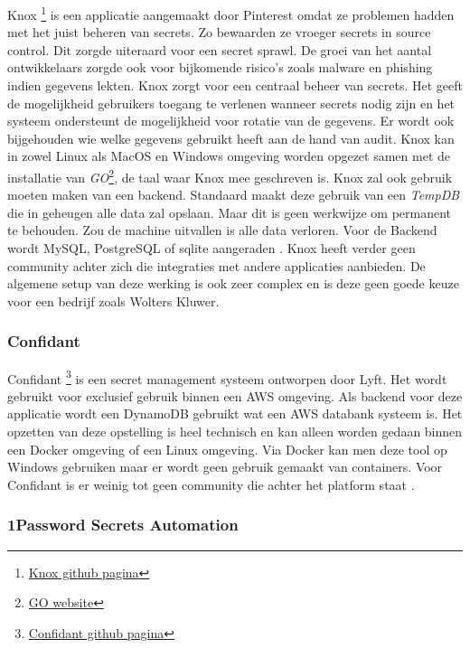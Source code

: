 Knox \footnote{\href{https://github.com/pinterest/knox}{Knox github pagina}} is een applicatie aangemaakt door Pinterest omdat ze problemen hadden met het juist beheren van secrets. Zo bewaarden ze vroeger secrets in source control. Dit zorgde uiteraard voor een secret sprawl. De groei van het aantal ontwikkelaars zorgde ook voor bijkomende risico's zoals malware en phishing indien gegevens lekten. Knox zorgt voor een centraal beheer van secrets. Het geeft de mogelijkheid gebruikers toegang te verlenen wanneer secrets nodig zijn en het systeem ondersteunt de mogelijkheid voor rotatie van de gegevens. Er wordt ook bijgehouden wie welke gegevens gebruikt heeft aan de hand van audit. Knox kan in zowel Linux als MacOS en Windows omgeving worden opgezet samen met de installatie van \textit{GO}\footnote{\href{https://golang.org/doc/install}{GO website}}, de taal waar Knox mee geschreven is. Knox zal ook gebruik moeten maken van een backend. Standaard maakt deze gebruik van een \textit{TempDB} die in geheugen alle data zal opslaan. Maar dit is geen werkwijze om permanent te behouden. Zou de machine uitvallen is alle data verloren. Voor de Backend wordt MySQL, PostgreSQL of sqlite aangeraden \autocite{Lundberg2021}. Knox heeft verder geen community achter zich die integraties met andere applicaties aanbieden. De algemene setup van deze werking is ook zeer complex en is deze geen goede keuze voor een bedrijf zoals Wolters Kluwer.

\subsubsection{Confidant}

Confidant \footnote{\href{https://lyft.github.io/confidant/}{Confidant github pagina}} is een secret management systeem ontworpen door Lyft. Het wordt gebruikt voor exclusief gebruik binnen een AWS omgeving. Als backend voor deze applicatie wordt een DynamoDB gebruikt wat een AWS databank systeem is. Het opzetten van deze opstelling is heel technisch en kan alleen worden gedaan binnen een Docker omgeving of een Linux omgeving. Via Docker kan men deze tool op Windows gebruiken maar er wordt geen gebruik gemaakt van containers. Voor Confidant is er weinig tot geen community die achter het platform staat \autocite{Confidant2021}. 


\subsubsection{1Password Secrets Automation}

